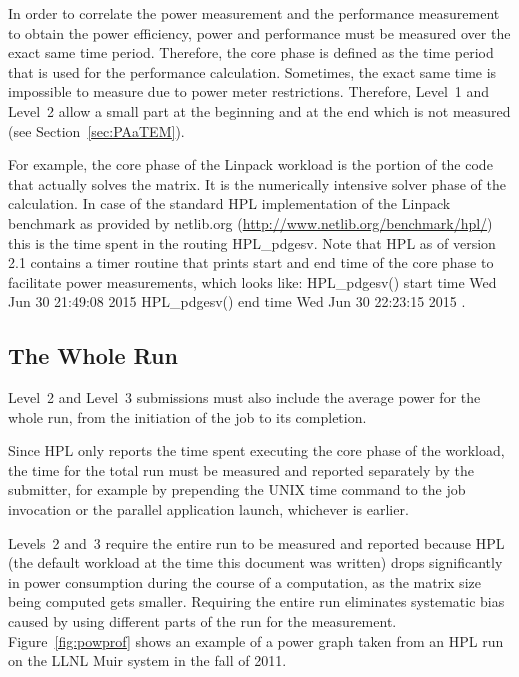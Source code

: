 \noindent
In order to correlate the power measurement and the performance measurement to obtain the power efficiency, power and performance must be measured over the exact same time period.
Therefore, the core phase is defined as the time period that is used for the performance calculation.
Sometimes, the exact same time is impossible to measure due to power meter restrictions.
Therefore, Level~1 and Level~2 allow a small part at the beginning and at the end which is not measured (see Section~\ref{sec:PAaTEM}).
\wl

\noindent
For example, the core phase of the Linpack workload is the portion of the code that actually solves the matrix.
It is the numerically intensive solver phase of the calculation.
In case of the standard HPL implementation of the Linpack benchmark as provided by netlib.org (\url{http://www.netlib.org/benchmark/hpl/}) this is the time spent in the routing {\ttfamily HPL\_pdgesv}.
Note that HPL as of version 2.1 contains a timer routine that prints start and end time of the core phase to facilitate power measurements, which looks like:\newline
{\ttfamily
HPL\_pdgesv() start time Wed Jun 30 21:49:08 2015\newline
HPL\_pdgesv() end time Wed Jun 30 22:23:15 2015
}.

\subsection{The Whole Run}
\noindent
Level~2 and Level~3 submissions must also include the average power for the whole run, from the initiation of the job to its completion.
\wl

\noindent
Since HPL only reports the time spent executing the core phase of the workload, the time for the total run must be measured and reported separately by the submitter, for example by prepending the UNIX time command to the job invocation or the parallel application launch, whichever is earlier.
\wl

\noindent
Levels~2 and~3 require the entire run to be measured and reported because HPL (the default workload at the time this document was written) drops significantly in power consumption during the course of a computation, as the matrix size being computed gets smaller.
Requiring the entire run eliminates systematic bias caused by using different parts of the run for the measurement.
Figure~\ref{fig:powprof} shows an example of a power graph taken from an HPL run on the LLNL Muir system in the fall of 2011.
\wl

